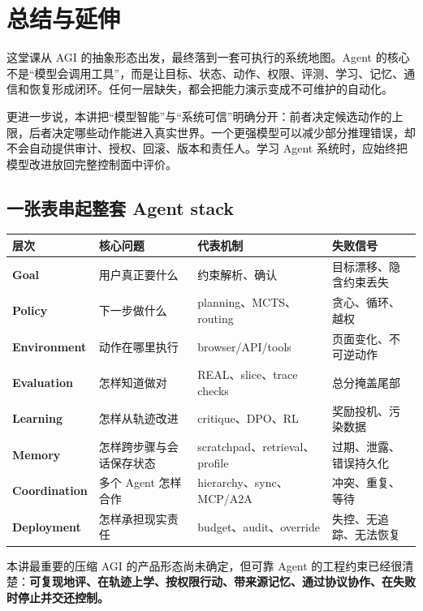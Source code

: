 \section{总结与延伸}

这堂课从 AGI 的抽象形态出发，最终落到一套可执行的系统地图。Agent 的核心不是“模型会调用工具”，而是让目标、状态、动作、权限、评测、学习、记忆、通信和恢复形成闭环。任何一层缺失，都会把能力演示变成不可维护的自动化。

更进一步说，本讲把“模型智能”与“系统可信”明确分开：前者决定候选动作的上限，后者决定哪些动作能进入真实世界。一个更强模型可以减少部分推理错误，却不会自动提供审计、授权、回滚、版本和责任人。学习 Agent 系统时，应始终把模型改进放回完整控制面中评价。

\subsection{一张表串起整套 Agent stack}

\begin{center}
\begin{tabularx}{\textwidth}{>{\bfseries}p{} X X X}
层次 & 核心问题 & 代表机制 & 失败信号 \\
\hline
Goal & 用户真正要什么 & 约束解析、确认 & 目标漂移、隐含约束丢失 \\
Policy & 下一步做什么 & planning、MCTS、routing & 贪心、循环、越权 \\
Environment & 动作在哪里执行 & browser/API/tools & 页面变化、不可逆动作 \\
Evaluation & 怎样知道做对 & REAL、slice、trace checks & 总分掩盖尾部 \\
Learning & 怎样从轨迹改进 & critique、DPO、RL & 奖励投机、污染数据 \\
Memory & 怎样跨步骤与会话保存状态 & scratchpad、retrieval、profile & 过期、泄露、错误持久化 \\
Coordination & 多个 Agent 怎样合作 & hierarchy、sync、MCP/A2A & 冲突、重复、等待 \\
Deployment & 怎样承担现实责任 & budget、audit、override & 失控、无追踪、无法恢复 \\
\end{tabularx}
\end{center}

\begin{importantbox}{本讲最重要的压缩}
AGI 的产品形态尚未确定，但可靠 Agent 的工程约束已经很清楚：\textbf{可复现地评、在轨迹上学、按权限行动、带来源记忆、通过协议协作、在失败时停止并交还控制。}
\end{importantbox}

